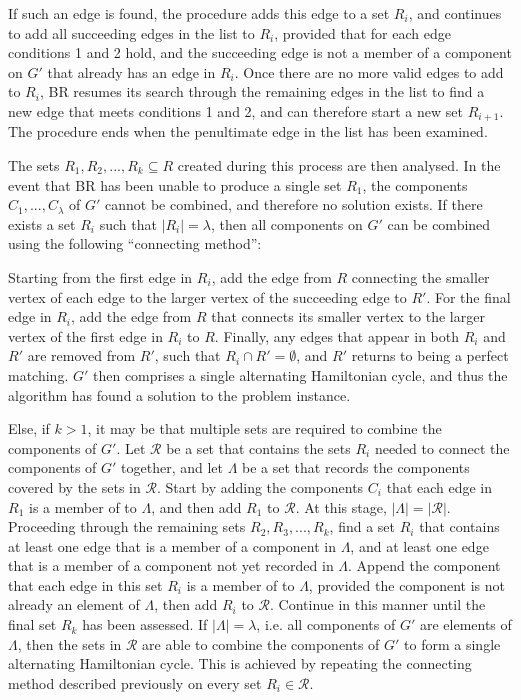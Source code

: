 \documentclass[oribibl]{llncs}
\begin{document}
If such an edge is found, the procedure adds this edge to a set $R_i$, and continues to add all succeeding edges in the list to $R_i$, provided that for each edge conditions 1 and 2 hold, and the succeeding edge is not a member of a component on $G'$ that already has an edge in $R_i$. Once there are no more valid edges to add to $R_i$, BR resumes its search through the remaining edges in the list to find a new edge that meets conditions 1 and 2, and can therefore start a new set $R_{i+1}$. The procedure ends when the penultimate edge in the list has been examined.

The sets $R_1, R_2, ..., R_k \subseteq R$ created during this process are then analysed. In the event that BR has been unable to produce a single set $R_1$, the components $C_1,..., C_{\lambda}$ of $G'$ cannot be combined, and therefore no solution exists. If there exists a set $R_i$ such that $|R_i| = \lambda$, then all components on $G'$ can be combined using the following ``connecting method'':

Starting from the first edge in $R_i$, add the edge from $R$ connecting the smaller vertex of each edge to the larger vertex of the succeeding edge to $R'$. For the final edge in $R_i$, add the edge from $R$ that connects its smaller vertex to the larger vertex of the first edge in $R_i$ to $R$. Finally, any edges that appear in both $R_i$ and $R'$ are removed from $R'$, such that $R_i \cap R' = \emptyset$, and $R'$ returns to being a perfect matching. $G'$ then comprises a single alternating Hamiltonian cycle, and thus the algorithm has found a solution to the problem instance.


Else, if $k > 1$, it may be that multiple sets are required to combine the components of $G'$. Let $\mathcal{R}$ be a set that contains the sets $R_i$ needed to connect the components of $G'$ together, and let $\Lambda$ be a set that records the components covered by the sets in $\mathcal{R}$. Start by adding the components $C_i$ that each edge in $R_1$ is a member of to $\Lambda$, and then add $R_1$ to $\mathcal{R}$. At this stage, $|\Lambda| = |\mathcal{R}|$. Proceeding through the remaining sets $R_2, R_3, ..., R_k$, find a set $R_i$ that contains at least one edge that is a member of a component in $\Lambda$, and at least one edge that is a member of a component not yet recorded in $\Lambda$. Append the component that each edge in this set $R_i$ is a member of to $\Lambda$, provided the component is not already an element of $\Lambda$, then add $R_i$ to $\mathcal{R}$. Continue in this manner until the final set $R_k$ has been assessed. If $|\Lambda| = \lambda$, i.e. all components of $G'$ are elements of $\Lambda$, then the sets in $\mathcal{R}$ are able to combine the components of $G'$ to form a single alternating Hamiltonian cycle. This is achieved by repeating the connecting method described previously on every set $R_i \in \mathcal{R}$.
\end{document}
